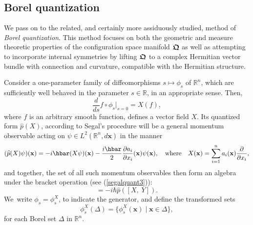 \documentclass[11pt]{amsart}
\numberwithin{equation}{section}
\theoremstyle{remark}
\newcommand{\be}{\begin{equation}}
\newcommand{\en}{\end{equation}}
\newcommand{\bfrakQ}{\mbox{\boldmath $\mathfrak Q$}}
\newcommand{\bx}{\mathbf x}
\begin{document}
\subsection{Borel quantization}\label{sec-synborquant}

We pass on to the related, and certainly more assiduously studied, method of
{\em Borel quantization}. This method focuses on both the geometric and measure
theoretic properties of the configuration space manifold $\bfrakQ$ as well as
attempting to incorporate internal symmetries by lifting $\bfrakQ$ to a complex
Hermitian vector bundle with connection and curvature, compatible with the
Hermitian structure.

Consider a one-parameter family of diffeomorphisms $s \mapsto \phi_{s}$ of
${\mathbb R}^n$, which are sufficiently well behaved in the parameter
$s \in \mathbb R$, in an appropriate sense. Then,
\be
   \frac d{ds} f\circ \phi_{s}\vert_{s=0} = X(f),
\label{diffeomorph8}
\en
where $f$ is an arbitrary smooth function, defines a vector field $X$.
Its quantized form $\widehat{p}(X)$, according to Segal's procedure will be a
general momentum observable acting on $\psi \in  L^{2}({\mathbb R}^n, d\bx )$
in the manner
\be
    (\widehat{p}(X)\psi )(\bx ) = -i\hbar (X\psi )(\bx ) -
      \frac {i\hbar}{2}\frac {\partial a_i}{\partial x_i}(\bx ) \psi (\bx ),
      \quad \mbox{\rm where} \quad X(\bx ) =
      \sum_{i=1}^{n}a_i(\bx ) \frac {\partial}{\partial x_i},
\label{genmomobs1}
\en
and together, the set of all such momentum observables
then form an algebra under the bracket
operation (see (\ref{segalquant3})):
\be
   [\widehat{p}(X), \; \widehat{p}(Y)] = -i\hbar \widehat{p}([X, \;Y]).
\label{genmomobs2}
\en
We~write $\phi_{s} = \phi_{s}^{X}$, to indicate the generator, and define the
transformed sets
\be
   \phi_{s}^{X}(\Delta ) = \{\phi_{s}^{X}(\bx ) \;\vert\; \bx \in \Delta\},
\label{transfset1}
\en
for each Borel set $\Delta$ in ${\mathbb R}^n$.
\end{document}
